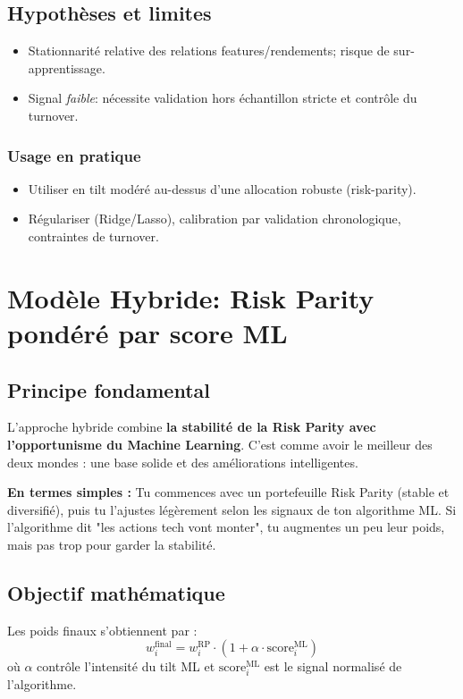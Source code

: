 \documentclass[11pt,a4paper]{article}
\begin{document}
\subsection{Hypothèses et limites}
\begin{itemize}
  \item Stationnarité relative des relations features/rendements; risque de sur-apprentissage.
  \item Signal \emph{faible}: nécessite validation hors échantillon stricte et contrôle du turnover.
\end{itemize}

\subsubsection*{Usage en pratique}
\begin{itemize}
  \item Utiliser en tilt modéré au-dessus d'une allocation robuste (risk-parity).
  \item Régulariser (Ridge/Lasso), calibration par validation chronologique, contraintes de turnover.
\end{itemize}

\FloatBarrier
\section{Modèle Hybride: Risk Parity pondéré par score ML}

\subsection{Principe fondamental}
L'approche hybride combine \textbf{la stabilité de la Risk Parity avec l'opportunisme du Machine Learning}. C'est comme avoir le meilleur des deux mondes : une base solide et des améliorations intelligentes.

\textbf{En termes simples :} Tu commences avec un portefeuille Risk Parity (stable et diversifié), puis tu l'ajustes légèrement selon les signaux de ton algorithme ML. Si l'algorithme dit "les actions tech vont monter", tu augmentes un peu leur poids, mais pas trop pour garder la stabilité.

\subsection{Objectif mathématique}
Les poids finaux s'obtiennent par :
\[w_i^{\text{final}} = w_i^{\text{RP}} \cdot (1 + \alpha \cdot \text{score}_i^{\text{ML}})\]
où \(\alpha\) contrôle l'intensité du tilt ML et \(\text{score}_i^{\text{ML}}\) est le signal normalisé de l'algorithme.
\end{document}
